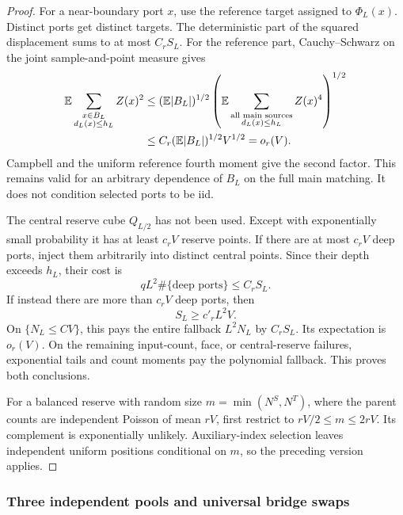 \documentclass[11pt,reqno]{amsart}
\theoremstyle{definition}
\theoremstyle{remark}
\numberwithin{equation}{section}
\newcommand{\E}{\mathbb E}
\begin{document}
\begin{proof}
For a near-boundary port \(x\), use the reference target assigned to
\(\Phi_L(x)\). Distinct ports get distinct targets. The deterministic
part of the squared displacement sums to at most \(C_r S_L\). For the
reference part, Cauchy--Schwarz on the joint sample-and-point measure gives
\begin{align}
 \E\sum_{\substack{x\in B_L\\d_L(x)\le h_L}}Z(x)^2
 &\le(\E|B_L|)^{1/2}
       \left(\E\sum_{\substack{\text{all main sources}\\d_L(x)\le h_L}}
                         Z(x)^4\right)^{1/2}\notag\\
 &\le C_r(\E|B_L|)^{1/2}V^{1/2}=o_r(V).
\label{strict-screen-adaptive-restriction}
\end{align}
Campbell and the uniform reference fourth moment give the second factor.
This remains valid for an arbitrary dependence of \(B_L\) on the full
main matching. It does not condition selected ports to be iid.

The central reserve cube \(Q_{L/2}\) has not been used. Except with
exponentially small probability it has at least \(c_rV\) reserve points.
If there are at most \(c_rV\) deep ports, inject them arbitrarily into
distinct central points. Since their depth exceeds \(h_L\), their cost is
\[
 qL^2\#\{\text{deep ports}\}\le C_r S_L.
\]
If instead there are more than \(c_rV\) deep ports, then
\begin{equation}
\label{strict-screen-deep-failure}
 S_L\ge c'_rL^2V.
\end{equation}
On \(\{N_L\le CV\}\), this pays the entire fallback \(L^2N_L\) by
\(C_r S_L\). Its expectation is \(o_r(V)\). On the remaining input-count,
face, or central-reserve failures, exponential tails and count moments
pay the polynomial fallback. This proves both conclusions.

For a balanced reserve with random size
\(m=\min(N^S,N^T)\), where the parent counts are independent Poisson
of mean \(rV\), first restrict to \(rV/2\le m\le2rV\). Its complement
is exponentially unlikely. Auxiliary-index selection leaves independent
uniform positions conditional on \(m\), so the preceding version applies.
\end{proof}

\subsubsection{Three independent pools and universal bridge swaps}
\end{document}
